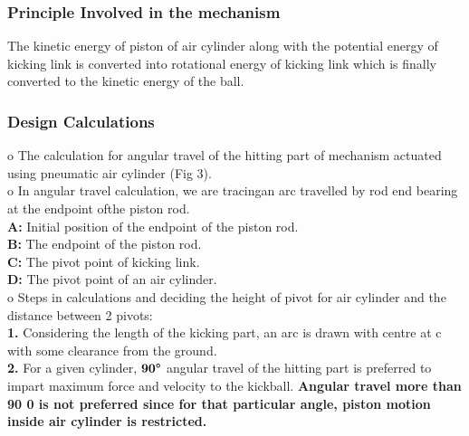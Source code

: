         \subsubsection{Principle Involved in the mechanism}
            The kinetic energy of piston of air cylinder along with the potential energy of kicking link is converted
            into rotational energy of kicking link which is finally converted to the kinetic energy of the ball.

        \subsubsection{Design Calculations}
            o The calculation for angular travel of the hitting part of mechanism actuated using pneumatic air cylinder (Fig 3).                    \\
            o In angular travel calculation, we are tracingan arc travelled by rod end bearing at the endpoint ofthe piston rod.                    \\
                \textbf{A:} Initial position of the endpoint of the piston rod.                                                                     \\
                \textbf{B:} The endpoint of the piston rod.                                                                                         \\
                \textbf{C:} The pivot point of kicking link.                                                                                        \\
                \textbf{D:} The pivot point of an air cylinder.                                                                                     \\
            o Steps in calculations and deciding the height of pivot for air cylinder and the distance between 2 pivots:                            \\
                \textbf{1.} Considering the length of the kicking part, an arc is drawn with centre at c with some clearance from the ground.       \\
                \textbf{2.} For a given cylinder, $\textbf{90\degree}$ angular travel of the hitting part is preferred to impart maximum force and velocity 
                            to the kickball. \textbf{Angular travel more than 90 0 is not preferred since for that particular angle, piston 
                            motion inside air cylinder is restricted.}                                                                                  \\
